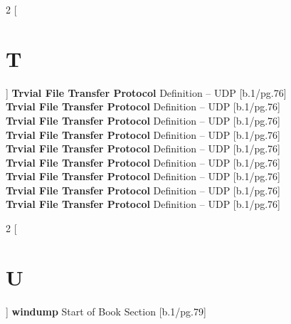 \documentclass{article}
\begin{document}
\begin{multicols}{2}
[
\section{T}
]
\textbf{Trvial File Transfer Protocol} Definition – UDP [b.1/pg.76]\\
\textbf{Trvial File Transfer Protocol} Definition – UDP [b.1/pg.76]\\
\textbf{Trvial File Transfer Protocol} Definition – UDP [b.1/pg.76]\\
\textbf{Trvial File Transfer Protocol} Definition – UDP [b.1/pg.76]\\
\textbf{Trvial File Transfer Protocol} Definition – UDP [b.1/pg.76]\\
\textbf{Trvial File Transfer Protocol} Definition – UDP [b.1/pg.76]\\
\textbf{Trvial File Transfer Protocol} Definition – UDP [b.1/pg.76]\\
\textbf{Trvial File Transfer Protocol} Definition – UDP [b.1/pg.76]\\
\textbf{Trvial File Transfer Protocol} Definition – UDP [b.1/pg.76]\\
\end{multicols}
\newpage
\begin{multicols}{2}
[
\section{U}
]
\textbf{windump} Start of Book Section [b.1/pg.79]\\
\end{multicols}
 
\end{document}
